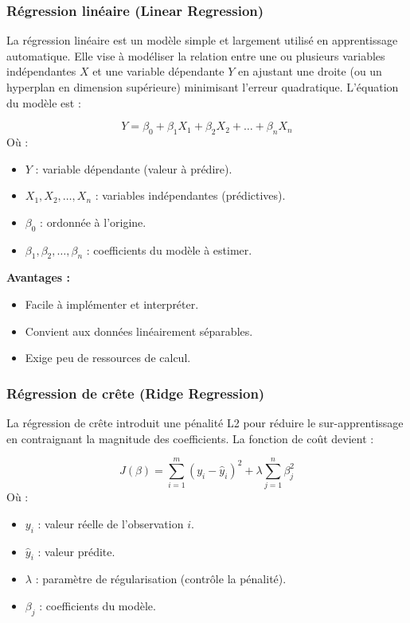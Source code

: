 \subsubsection{R\'egression lin\'eaire (Linear Regression)}

La r\'egression lin\'eaire est un mod\`ele simple et largement utilis\'e en apprentissage automatique. Elle vise \`a mod\'eliser la relation entre une ou plusieurs variables ind\'ependantes \(X\) et une variable d\'ependante \(Y\) en ajustant une droite (ou un hyperplan en dimension sup\'erieure) minimisant l'erreur quadratique. L'\'equation du mod\`ele est :

\begin{equation}
Y = \beta_0 + \beta_1 X_1 + \beta_2 X_2 + \dots + \beta_n X_n
\end{equation}
O\`u :
\begin{itemize}
	\item \( Y \) : variable d\'ependante (valeur \`a pr\'edire).
	\item \( X_1, X_2, \dots, X_n \) : variables ind\'ependantes (pr\'edictives).
	\item \( \beta_0 \) : ordonn\'ee \`a l'origine.
	\item \( \beta_1, \beta_2, \dots, \beta_n \) : coefficients du mod\`ele \`a estimer.
\end{itemize}

\textbf{Avantages :}
\begin{itemize}
	\item Facile \`a impl\'ementer et interpr\'eter.
	\item Convient aux donn\'ees lin\'eairement s\'eparables.
	\item Exige peu de ressources de calcul.
\end{itemize}

\subsubsection{R\'egression de cr\^ete (Ridge Regression)}

La r\'egression de cr\^ete introduit une p\'enalit\'e L2 pour r\'eduire le sur-apprentissage en contraignant la magnitude des coefficients. La fonction de co\^ut devient :

\begin{equation}
J(\beta) = \sum_{i=1}^{m} (y_i - \hat{y}_i)^2 + \lambda \sum_{j=1}^{n} \beta_j^2
\end{equation}
O\`u :
\begin{itemize}
	\item \( y_i \) : valeur r\'eelle de l'observation \(i\).
	\item \( \hat{y}_i \) : valeur pr\'edite.
	\item \( \lambda \) : param\`etre de r\'egularisation (contr\^ole la p\'enalit\'e).
	\item \( \beta_j \) : coefficients du mod\`ele.
\end{itemize}

